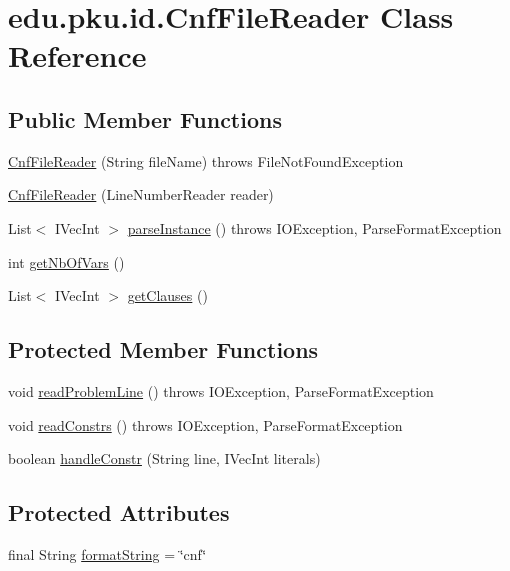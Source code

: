 \hypertarget{classedu_1_1pku_1_1id_1_1_cnf_file_reader}{
\section{edu.pku.id.CnfFileReader Class Reference}
\label{classedu_1_1pku_1_1id_1_1_cnf_file_reader}
}
\subsection*{Public Member Functions}
\begin{DoxyCompactItemize}
\item 
\hyperlink{classedu_1_1pku_1_1id_1_1_cnf_file_reader_a6eecca109338b3f8006d6122a79026b0}{CnfFileReader} (String fileName)  throws FileNotFoundException 
\item 
\hyperlink{classedu_1_1pku_1_1id_1_1_cnf_file_reader_a0d2501b760444cce91cc37bae086e233}{CnfFileReader} (LineNumberReader reader)
\item 
List$<$ IVecInt $>$ \hyperlink{classedu_1_1pku_1_1id_1_1_cnf_file_reader_ad28921b66800cbea2597313f73b15f40}{parseInstance} ()  throws IOException, ParseFormatException 
\item 
int \hyperlink{classedu_1_1pku_1_1id_1_1_cnf_file_reader_a6124e64a439627978a12b37cae41ab40}{getNbOfVars} ()
\item 
List$<$ IVecInt $>$ \hyperlink{classedu_1_1pku_1_1id_1_1_cnf_file_reader_aa29bd3e8b77179e6ac995fde035aa1cd}{getClauses} ()
\end{DoxyCompactItemize}
\subsection*{Protected Member Functions}
\begin{DoxyCompactItemize}
\item 
void \hyperlink{classedu_1_1pku_1_1id_1_1_cnf_file_reader_a819dc58e1ce221177a9d8055864d6a44}{readProblemLine} ()  throws IOException, ParseFormatException 
\item 
void \hyperlink{classedu_1_1pku_1_1id_1_1_cnf_file_reader_abeb66b6f42d870ea43dcc19cdc950a8f}{readConstrs} ()  throws IOException, ParseFormatException 
\item 
boolean \hyperlink{classedu_1_1pku_1_1id_1_1_cnf_file_reader_abd243e9f3ff24231cc3117363fa2a9b6}{handleConstr} (String line, IVecInt literals)
\end{DoxyCompactItemize}
\subsection*{Protected Attributes}
\begin{DoxyCompactItemize}
\item 
final String \hyperlink{classedu_1_1pku_1_1id_1_1_cnf_file_reader_a2d67af544ebc5ae1e787e00a8104b675}{formatString} = \char`\"{}cnf\char`\"{}
\end{DoxyCompactItemize}
